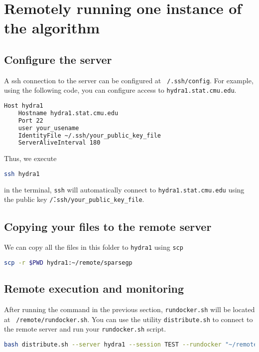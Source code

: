 \documentclass[12pt, letterpaper, onecolumn]{article}
\begin{document}
\pagebreak

\section{Remotely running one instance of the algorithm}

\subsection{Configure the server}

A ssh connection to the server can be configured at \texttt{~/.ssh/config}. For example, using the following code, you can configure access to \texttt{hydra1.stat.cmu.edu}.

\begin{lstlisting}[language=Bash]
Host hydra1
	Hostname hydra1.stat.cmu.edu
	Port 22
	user your_usename
	IdentityFile ~/.ssh/your_public_key_file
	ServerAliveInterval 180
\end{lstlisting}  

Thus, we execute \begin{lstlisting}[language=Bash]
ssh hydra1
\end{lstlisting} in the terminal, \texttt{ssh} will automatically connect to \texttt{hydra1.stat.cmu.edu} using the public key \texttt{\~/.ssh/your\_public\_key\_file}. 

\subsection{Copying your files to the remote server}

We can copy all the files in this folder to \texttt{hydra1} using \texttt{scp} \begin{lstlisting}[language=Bash]
scp -r $PWD hydra1:~/remote/sparsegp
\end{lstlisting} 


\subsection{Remote execution and monitoring}

After running the command in the previous section, \texttt{rundocker.sh} will be located at \texttt{~/remote/rundocker.sh}. You can use the utility \texttt{distribute.sh} to connect to the remote server and run your \texttt{rundocker.sh} script.

\begin{lstlisting}[language=Bash]
bash distribute.sh --server hydra1 --session TEST --rundocker "~/remote/sparsegp"
\end{lstlisting}  
\end{document}

